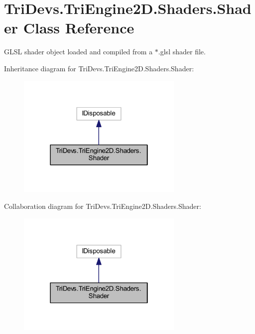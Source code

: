 \hypertarget{class_tri_devs_1_1_tri_engine2_d_1_1_shaders_1_1_shader}{\section{Tri\-Devs.\-Tri\-Engine2\-D.\-Shaders.\-Shader Class Reference}
\label{class_tri_devs_1_1_tri_engine2_d_1_1_shaders_1_1_shader}
}


G\-L\-S\-L shader object loaded and compiled from a $\ast$.glsl shader file.  




Inheritance diagram for Tri\-Devs.\-Tri\-Engine2\-D.\-Shaders.\-Shader\-:\nopagebreak
\begin{figure}[H]
\begin{center}
\leavevmode
\includegraphics[width=226pt]{class_tri_devs_1_1_tri_engine2_d_1_1_shaders_1_1_shader__inherit__graph}
\end{center}
\end{figure}


Collaboration diagram for Tri\-Devs.\-Tri\-Engine2\-D.\-Shaders.\-Shader\-:\nopagebreak
\begin{figure}[H]
\begin{center}
\leavevmode
\includegraphics[width=226pt]{class_tri_devs_1_1_tri_engine2_d_1_1_shaders_1_1_shader__coll__graph}
\end{center}
\end{figure}
